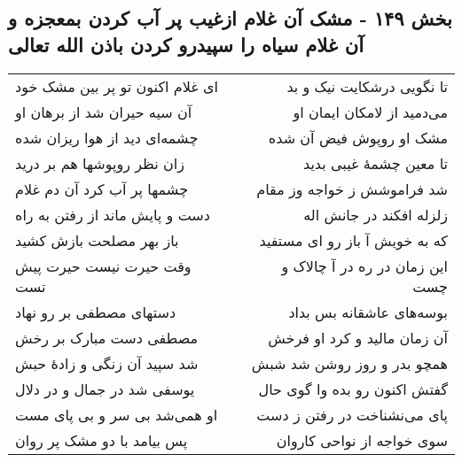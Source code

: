 \begin{center}
\section*{بخش ۱۴۹ - مشک آن غلام ازغیب پر آب کردن بمعجزه و آن غلام سیاه را سپیدرو کردن باذن الله تعالی}
\label{sec:sh149}
\begin{longtable}{l p{0.5cm} r}
ای غلام اکنون تو پر بین مشک خود
&&
تا نگویی درشکایت نیک و بد
\\
آن سیه حیران شد از برهان او
&&
می‌دمید از لامکان ایمان او
\\
چشمه‌ای دید از هوا ریزان شده
&&
مشک او روپوش فیض آن شده
\\
زان نظر روپوشها هم بر درید
&&
تا معین چشمهٔ غیبی بدید
\\
چشمها پر آب کرد آن دم غلام
&&
شد فراموشش ز خواجه وز مقام
\\
دست و پایش ماند از رفتن به راه
&&
زلزله افکند در جانش اله
\\
باز بهر مصلحت بازش کشید
&&
که به خویش آ باز رو ای مستفید
\\
وقت حیرت نیست حیرت پیش تست
&&
این زمان در ره در آ چالاک و چست
\\
دستهای مصطفی بر رو نهاد
&&
بوسه‌های عاشقانه بس بداد
\\
مصطفی دست مبارک بر رخش
&&
آن زمان مالید و کرد او فرخش
\\
شد سپید آن زنگی و زادهٔ حبش
&&
همچو بدر و روز روشن شد شبش
\\
یوسفی شد در جمال و در دلال
&&
گفتش اکنون رو بده وا گوی حال
\\
او همی‌شد بی سر و بی پای مست
&&
پای می‌نشناخت در رفتن ز دست
\\
پس بیامد با دو مشک پر روان
&&
سوی خواجه از نواحی کاروان
\\
\end{longtable}
\end{center}

